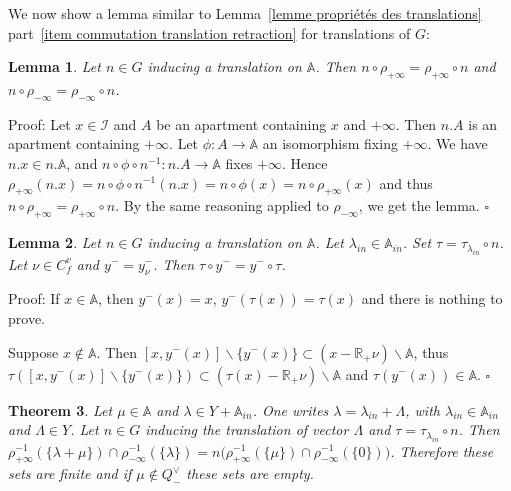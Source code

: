 \documentclass[12pt]{article}
\theoremstyle{plain}
\newtheorem{thm}{Theorem}[section] %
\newtheorem{lemme}[thm]{Lemma}
\theoremstyle{definition}
\newcommand{\R}{\mathbb{R}}
\newcommand{\A}{\mathbb{A}}
\begin{document}
\vspace{3mm}

We now show a lemma similar to Lemma~\ref{lemme propriétés des translations} part~\ref{item commutation translation retraction} for translations of $G$: 

\begin{lemme}\label{lemme commutation des translations et rétractions}
Let $n\in G$ inducing a translation on $\A$. Then $n\circ\rho_{+\infty}=\rho_{+\infty}\circ n$ and $n\circ \rho_{-\infty}=\rho_{-\infty}\circ n$.
\end{lemme}

Proof: 
Let $x\in\mathcal{I}$ and $A$ be an apartment containing $x$ and $+\infty$. Then $n.A$ is an apartment containing $+\infty$. Let $\phi:A\rightarrow \mathbb{A}$ an isomorphism fixing $+\infty$. We have $n.x\in n.\mathbb{A}$, and $n\circ\phi\circ n^{-1}:n.A\rightarrow \mathbb{A}$ fixes $+\infty$. Hence $\rho_{+\infty}(n.x)=n\circ\phi\circ n^{-1}(n.x)=n\circ\phi(x)=n\circ\rho_{+\infty}(x)$ and thus $n\circ \rho_{+\infty}=\rho_{+\infty}\circ n$. By the same reasoning applied to $\rho_{-\infty}$, we get the lemma. $\square$
 
 
 

\begin{lemme}\label{lemme y- des translatés}
Let $n\in G$ inducing a translation on $\mathbb{A}$. Let $\lambda_{in}\in \A_{in}$. Set $\tau=\tau_{\lambda_{in}}\circ n$. Let $\nu\in C_f^v$ and $y^-=y_\nu^-$. Then $\tau\circ y^-=y^-\circ \tau$.
\end{lemme}

Proof: If $x\in \mathbb{A}$, then $y^-(x)=x$, $y^-(\tau(x))=\tau(x)$ and there is nothing to prove. 

Suppose $x\notin \mathbb{A}$. 
Then $[x,y^-(x)]\backslash \{y^-(x)\}\subset (x-\R_+\nu)\backslash \mathbb{A}$,
 thus $\tau([x,y^-(x)]\backslash\{y^-(x)\})\subset (\tau(x)-\R_+\nu)\backslash \mathbb{A}$ and $\tau(y^-(x))\in \mathbb{A}$. $\square$
 




\begin{thm}\label{thm invariance des cardinaux}
Let $\mu\in \A$ and $\lambda\in Y+\A_{in}$. One writes $\lambda=\lambda_{in}+\Lambda$, with $\lambda_{in}\in\A_{in}$ and $\Lambda\in Y$. Let $n\in G$ inducing the translation of vector $\Lambda$ and $\tau=\tau_{\lambda_{in}}\circ n$. Then $\rho_{+\infty}^{-1}(\{\lambda+\mu\})\cap\rho_{-\infty}^{-1}(\{\lambda\})=n\big(\rho_{+\infty}^{-1}(\{\mu\})\cap\rho_{-\infty}^{-1}(\{0\})\big)$. Therefore these sets are finite and if $\mu\notin Q^\vee_-$ these sets are empty.

\end{thm}
\end{document}
